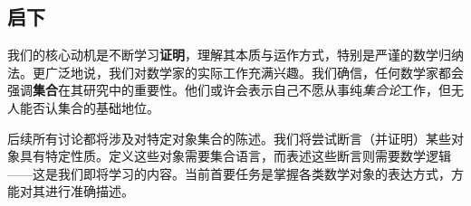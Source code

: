 \subsection{启下}

我们的核心动机是不断学习\textbf{证明}，理解其本质与运作方式，特别是严谨的数学归纳法。更广泛地说，我们对数学家的实际工作充满兴趣。我们确信，任何数学家都会强调\textbf{集合}在其研究中的重要性。他们或许会表示自己不愿从事纯\emph{集合论}工作，但无人能否认集合的基础地位。

后续所有讨论都将涉及对特定对象集合的陈述。我们将尝试断言（并证明）某些对象具有特定性质。定义这些对象需要集合语言，而表述这些断言则需要数学逻辑——这是我们即将学习的内容。当前首要任务是掌握各类数学对象的表达方式，方能对其进行准确描述。
